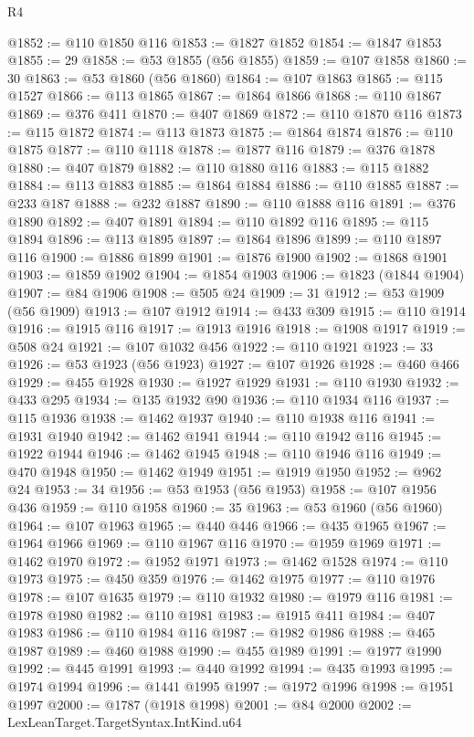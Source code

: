 \begin{lexlean}{R4}
\begin{coremodule}
@1852 := @110 @1850 @116
@1853 := @1827 @1852
@1854 := @1847 @1853
@1855 := 29
@1858 := @53 @1855 (@56 @1855)
@1859 := @107 @1858
@1860 := 30
@1863 := @53 @1860 (@56 @1860)
@1864 := @107 @1863
@1865 := @115 @1527
@1866 := @113 @1865
@1867 := @1864 @1866
@1868 := @110 @1867
@1869 := @376 @411
@1870 := @407 @1869
@1872 := @110 @1870 @116
@1873 := @115 @1872
@1874 := @113 @1873
@1875 := @1864 @1874
@1876 := @110 @1875
@1877 := @110 @1118
@1878 := @1877 @116
@1879 := @376 @1878
@1880 := @407 @1879
@1882 := @110 @1880 @116
@1883 := @115 @1882
@1884 := @113 @1883
@1885 := @1864 @1884
@1886 := @110 @1885
@1887 := @233 @187
@1888 := @232 @1887
@1890 := @110 @1888 @116
@1891 := @376 @1890
@1892 := @407 @1891
@1894 := @110 @1892 @116
@1895 := @115 @1894
@1896 := @113 @1895
@1897 := @1864 @1896
@1899 := @110 @1897 @116
@1900 := @1886 @1899
@1901 := @1876 @1900
@1902 := @1868 @1901
@1903 := @1859 @1902
@1904 := @1854 @1903
@1906 := @1823 (@1844 @1904)
@1907 := @84 @1906
@1908 := @505 @24
@1909 := 31
@1912 := @53 @1909 (@56 @1909)
@1913 := @107 @1912
@1914 := @433 @309
@1915 := @110 @1914
@1916 := @1915 @116
@1917 := @1913 @1916
@1918 := @1908 @1917
@1919 := @508 @24
@1921 := @107 @1032 @456
@1922 := @110 @1921
@1923 := 33
@1926 := @53 @1923 (@56 @1923)
@1927 := @107 @1926
@1928 := @460 @466
@1929 := @455 @1928
@1930 := @1927 @1929
@1931 := @110 @1930
@1932 := @433 @295
@1934 := @135 @1932 @90
@1936 := @110 @1934 @116
@1937 := @115 @1936
@1938 := @1462 @1937
@1940 := @110 @1938 @116
@1941 := @1931 @1940
@1942 := @1462 @1941
@1944 := @110 @1942 @116
@1945 := @1922 @1944
@1946 := @1462 @1945
@1948 := @110 @1946 @116
@1949 := @470 @1948
@1950 := @1462 @1949
@1951 := @1919 @1950
@1952 := @962 @24
@1953 := 34
@1956 := @53 @1953 (@56 @1953)
@1958 := @107 @1956 @436
@1959 := @110 @1958
@1960 := 35
@1963 := @53 @1960 (@56 @1960)
@1964 := @107 @1963
@1965 := @440 @446
@1966 := @435 @1965
@1967 := @1964 @1966
@1969 := @110 @1967 @116
@1970 := @1959 @1969
@1971 := @1462 @1970
@1972 := @1952 @1971
@1973 := @1462 @1528
@1974 := @110 @1973
@1975 := @450 @359
@1976 := @1462 @1975
@1977 := @110 @1976
@1978 := @107 @1635
@1979 := @110 @1932
@1980 := @1979 @116
@1981 := @1978 @1980
@1982 := @110 @1981
@1983 := @1915 @411
@1984 := @407 @1983
@1986 := @110 @1984 @116
@1987 := @1982 @1986
@1988 := @465 @1987
@1989 := @460 @1988
@1990 := @455 @1989
@1991 := @1977 @1990
@1992 := @445 @1991
@1993 := @440 @1992
@1994 := @435 @1993
@1995 := @1974 @1994
@1996 := @1441 @1995
@1997 := @1972 @1996
@1998 := @1951 @1997
@2000 := @1787 (@1918 @1998)
@2001 := @84 @2000
@2002 := LexLeanTarget.TargetSyntax.IntKind.u64

\end{coremodule}
\end{lexlean}
